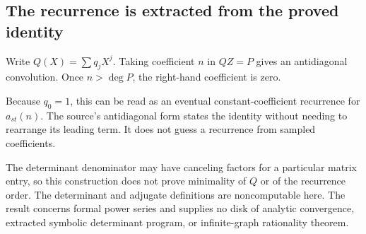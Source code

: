 \subsection{The recurrence is extracted from the proved identity}

Write $Q(X)=\sum q_jX^j$. Taking coefficient $n$ in $QZ=P$ gives an antidiagonal convolution. Once $n>\deg P$, the right-hand coefficient is zero.

Because $q_0=1$, this can be read as an eventual constant-coefficient recurrence for $a_{st}(n)$. The source's antidiagonal form states the identity without needing to rearrange its leading term. It does not guess a recurrence from sampled coefficients.

The determinant denominator may have canceling factors for a particular matrix entry, so this construction does not prove minimality of $Q$ or of the recurrence order. The determinant and adjugate definitions are noncomputable here. The result concerns formal power series and supplies no disk of analytic convergence, extracted symbolic determinant program, or infinite-graph rationality theorem.

